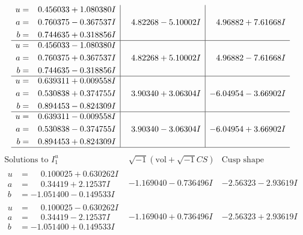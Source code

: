 \documentclass[1p]{elsarticle_modified}
\theoremstyle{definition}
\newcommand{\I}{\sqrt{-1}}
\begin{document}
$$\begin{array}{c|c|c}
\begin{aligned}
u &= \phantom{-}0.456033 + 1.080380 I \\
a &= \phantom{-}0.760375 - 0.367537 I \\
b &= \phantom{-}0.744635 + 0.318856 I\end{aligned}
 & \phantom{-}4.82268 - 5.10002 I & \phantom{-}4.96882 + 7.61668 I \\ \hline\begin{aligned}
u &= \phantom{-}0.456033 - 1.080380 I \\
a &= \phantom{-}0.760375 + 0.367537 I \\
b &= \phantom{-}0.744635 - 0.318856 I\end{aligned}
 & \phantom{-}4.82268 + 5.10002 I & \phantom{-}4.96882 - 7.61668 I \\ \hline\begin{aligned}
u &= \phantom{-}0.639311 + 0.009558 I \\
a &= \phantom{-}0.530838 + 0.374755 I \\
b &= \phantom{-}0.894453 - 0.824309 I\end{aligned}
 & \phantom{-}3.90340 + 3.06304 I & -6.04954 - 3.66902 I \\ \hline\begin{aligned}
u &= \phantom{-}0.639311 - 0.009558 I \\
a &= \phantom{-}0.530838 - 0.374755 I \\
b &= \phantom{-}0.894453 + 0.824309 I\end{aligned}
 & \phantom{-}3.90340 - 3.06304 I & -6.04954 + 3.66902 I\\
 \hline 
 \end{array}$$\newpage$$\begin{array}{c|c|c}  
\text{Solutions to }I^u_{1}& \I (\text{vol} + \sqrt{-1}CS) & \text{Cusp shape}\\
 \hline 
\begin{aligned}
u &= \phantom{-}0.100025 + 0.630262 I \\
a &= \phantom{-}0.34419 + 2.12537 I \\
b &= -1.051400 - 0.149533 I\end{aligned}
 & -1.169040 - 0.736496 I & -2.56323 - 2.93619 I \\ \hline\begin{aligned}
u &= \phantom{-}0.100025 - 0.630262 I \\
a &= \phantom{-}0.34419 - 2.12537 I \\
b &= -1.051400 + 0.149533 I\end{aligned}
 & -1.169040 + 0.736496 I & -2.56323 + 2.93619 I \\ \hline\begin{aligned}

\end{aligned}
\end{array}$$
\end{document}
